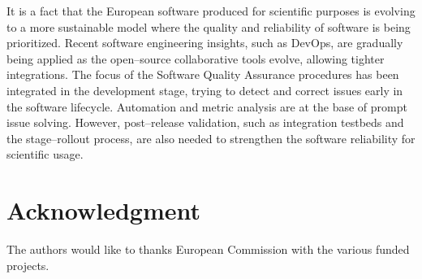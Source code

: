 \documentclass[journal]{IEEEtran}
\begin{document}
It is a fact that the European software produced for scientific purposes is
evolving to a more sustainable model where the quality and reliability of
software is being prioritized. Recent software engineering insights, such as
DevOps, are gradually being applied as the open--source collaborative tools
evolve, allowing tighter integrations. The focus of the Software Quality
Assurance procedures has been integrated in the development stage, trying to
detect and correct issues early in the software lifecycle. Automation and
metric analysis are at the base of prompt issue solving. However, post--release
validation, such as integration testbeds and the stage--rollout process, are
also needed to strengthen the software reliability for scientific usage.


%


\section*{Acknowledgment}

The authors would like to thanks European Commission with the various funded
projects.


\ifCLASSOPTIONcaptionsoff
  \newpage
\fi




\end{document}

